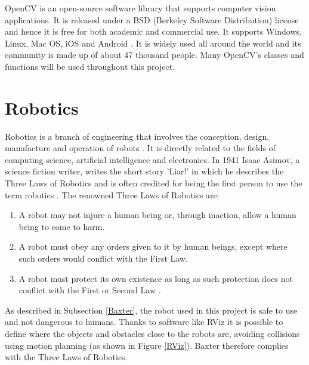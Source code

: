 \documentclass{l4proj}
\begin{document}
OpenCV is an open-source software library that supports computer vision applications. It is released under a BSD (Berkeley Software Distribution) license and hence it is free for both academic and commercial use. It supports Windows, Linux, Mac OS, iOS and Android \cite{OpenCV}. It is widely used all around the world and its community is made up of about 47 thousand people. Many OpenCV's classes and functions will be used throughout this project.




\section{Robotics}

Robotics is a branch of engineering that involves the conception, design, manufacture and operation of robots \cite{WhatIsRobotics}. It is directly related to the fields of computing science, artificial intelligence and electronics. In 1941 Isaac Asimov, a science fiction writer, writes the short story 'Liar!' in which he describes the Three Laws of Robotics and is often credited for being the first person to use the term robotics \cite{RoboticsWordCoined}. The renowned Three Laws of Robotics are:

\begin{enumerate}
	\item A robot may not injure a human being or, through inaction, allow a human being to come to harm.
	\item A robot must obey any orders given to it by human beings, except where such orders would conflict with the First Law.
	\item A robot must protect its own existence as long as such protection does not conflict with the First or Second Law \cite{ThreeLaws}.
\end{enumerate}

As described in Subsection \ref{Baxter}, the robot used in this project is safe to use and not dangerous to humans. Thanks to software like RViz it is possible to define where the objects and obstacles close to the robots are, avoiding collisions using motion planning (as shown in Figure \ref{RViz}). Baxter therefore complies with the Three Laws of Robotics.
\end{document}
